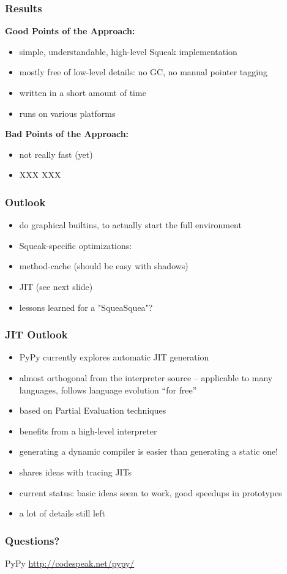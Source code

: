 \documentclass[utf8x]{beamer}
\begin{document}
\begin{frame}
    \frametitle{Results}
    {\bf Good Points of the Approach:}
    \begin{itemize}
    \item simple, understandable, high-level Squeak implementation
    \item mostly free of low-level details: no GC, no manual pointer tagging
    \item written in a short amount of time
    \item runs on various platforms
    \end{itemize}
    \pause
    {\bf Bad Points of the Approach:}
    \begin{itemize}
    \item not really fast (yet)
    \item XXX XXX
    \end{itemize}
\end{frame}

\begin{frame}
    \frametitle{Outlook}
    \begin{itemize}
    \item do graphical builtins, to actually start the full environment
    \item Squeak-specific optimizations:
    \item method-cache (should be easy with shadows)
    \item JIT (see next slide)
    \item lessons learned for a "SqueaSquea"?
    \end{itemize}
\end{frame}

\begin{frame}
    \frametitle{JIT Outlook}
    \begin{itemize}
    \item PyPy currently explores automatic JIT generation
    \item almost orthogonal from the interpreter source – applicable to many
          languages, follows language evolution ``for free''
    \item based on Partial Evaluation techniques
    \item benefits from a high-level interpreter
    \item generating a dynamic compiler is easier than generating a static one!
    \item shares ideas with tracing JITs
    \pause
    \item current status: basic ideas seem to work, good speedups in prototypes
    \item a lot of details still left
    \end{itemize}
\end{frame}

\begin{frame}
  \frametitle{Questions?}
  \begin{block}{
    PyPy}
    \bigskip
    \hskip 1cm \url{http://codespeak.net/pypy/}
    \bigskip
  \end{block}
\end{frame}
\end{document}
